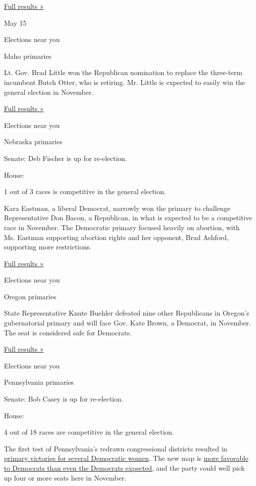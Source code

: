 \href{https://www.nytimes3xbfgragh.onion/interactive/2018/05/08/us/elections/results-west-virginia-primary-elections.html}{Full
results »}

May 15

Elections near you

Idaho primaries

Lt. Gov. Brad Little won the Republican nomination to replace the
three-term incumbent Butch Otter, who is retiring. Mr. Little is
expected to easily win the general election in November.

\href{https://www.nytimes3xbfgragh.onion/interactive/2018/05/15/us/elections/results-idaho-primary-elections.html}{Full
results »}

Elections near you

Nebraska primaries

Senate: Deb Fischer is up for re-election.

House:

1 out of 3 races is competitive in the general election.

Kara Eastman, a liberal Democrat, narrowly won the primary to challenge
Representative Don Bacon, a Republican, in what is expected to be a
competitive race in November. The Democratic primary focused heavily on
abortion, with Ms. Eastman supporting abortion rights and her opponent,
Brad Ashford, supporting more restrictions.

\href{https://www.nytimes3xbfgragh.onion/interactive/2018/05/15/us/elections/results-nebraska-primary-elections.html}{Full
results »}

Elections near you

Oregon primaries

State Representative Knute Buehler defeated nine other Republicans in
Oregon's gubernatorial primary and will face Gov. Kate Brown, a
Democrat, in November. The seat is considered safe for Democrats.

\href{https://www.nytimes3xbfgragh.onion/interactive/2018/05/15/us/elections/results-oregon-primary-elections.html}{Full
results »}

Elections near you

Pennsylvania primaries

Senate: Bob Casey is up for re-election.

House:

4 out of 18 races are competitive in the general election.

The first test of Pennsylvania's redrawn congressional districts
resulted in
\href{https://www.nytimes3xbfgragh.onion/2018/05/15/us/politics/pennsylvania-primaries.html}{primary
victories for several Democratic women}. The new map is
\href{https://www.nytimes3xbfgragh.onion/2018/02/21/upshot/gerrymandering-pennsylvania-democrats-republicans-court.html}{more
favorable to Democrats than even the Democrats expected}, and the party
could well pick up four or more seats here in November.

